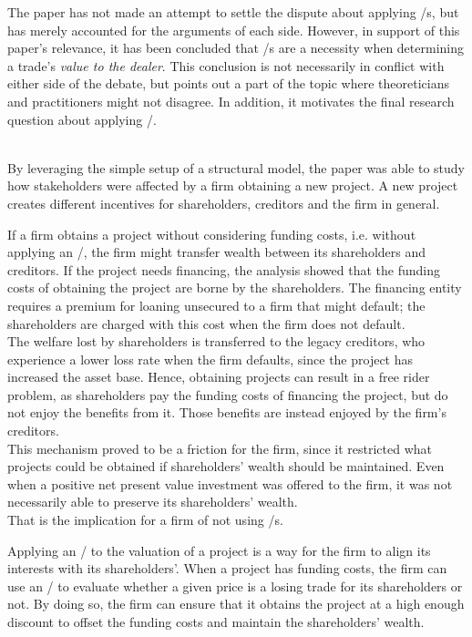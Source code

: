 \documentclass[main.tex]{subfiles}
\begin{document}
    The paper has not made an attempt to settle the dispute about applying \FVA/s,
    but has merely accounted for the arguments of each side.
    However, in support of this paper's relevance,
    it has been concluded that \FVA/s are a necessity 
    when determining a trade's \textit{value to the dealer}.
    This conclusion is not necessarily in conflict with either side of the debate,
    but points out a part of the topic where theoreticians and practitioners might not disagree.
    In addition, it motivates the final research question about applying \FVA/.

    \textbf{\researchQuestionFvaImplications}\\
    By leveraging the simple setup of a structural model,
    the paper was able to study how stakeholders were affected by a firm obtaining a new project.
    A new project creates different incentives for shareholders, creditors and the firm in general.

    If a firm obtains a project without considering funding costs, 
    i.e. without applying an \FVA/,
    the firm might transfer wealth between its shareholders and creditors.
    If the project needs financing, 
    the analysis showed that the funding costs 
    of obtaining the project are borne by the shareholders.
    The financing entity requires a premium for loaning unsecured to a firm that might default;
    the shareholders are charged with this cost when the firm does not default.
    \\
    The welfare lost by shareholders is transferred to the legacy creditors,
    who experience a lower loss rate when the firm defaults, 
    since the project has increased the asset base.
    Hence, obtaining projects can result in a free rider problem, 
    as shareholders pay the funding costs of financing the project,
    but do not enjoy the benefits from it.
    Those benefits are instead enjoyed by the firm's creditors. 
    \\
    This mechanism proved to be a friction for the firm, 
    since it restricted what projects could be obtained if shareholders' wealth should be maintained.
    Even when a positive net present value investment was offered to the firm, 
    it was not necessarily able to preserve its shareholders' wealth.
    \\
    That is the implication for a firm of not using \FVA/s.

    Applying an \FVA/ to the valuation of a project is a way for the firm 
    to align its interests with its shareholders'.
    When a project has funding costs,
    the firm can use an \FVA/ to evaluate
    whether a given price is a losing trade for its shareholders or not.
    By doing so, the firm can ensure that it obtains the project at a high enough discount
    to offset the funding costs and maintain the shareholders' wealth.
\end{document}
